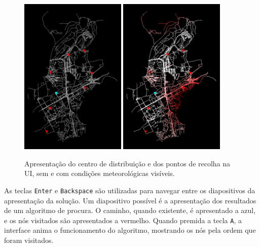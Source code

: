 \documentclass[12pt, a4paper, titlepage]{article}
\begin{document}
\begin{figure}[H]
    \centering
    \includegraphics[width=0.45\textwidth]{res/PontosImportantes.png}
    \includegraphics[width=0.45\textwidth]{res/Tempo.png}
    \caption{
        Apresentação do centro de distribuição e dos pontos de recolha na UI, sem e com condições
        meteorológicas visíveis.
    }
\end{figure}

As teclas \texttt{Enter} e \texttt{Backspace} são utilizadas para navegar entre os diapositivos da
apresentação da solução. Um diapositivo possível é a apresentação dos resultados de um algoritmo de
procura. O caminho, quando existente, é apresentado a azul, e os nós visitados são apresentados a
vermelho. Quando premida a tecla \texttt{A}, a interface anima o funcionamento do algoritmo,
mostrando os nós pela ordem que foram visitados.
\end{document}
